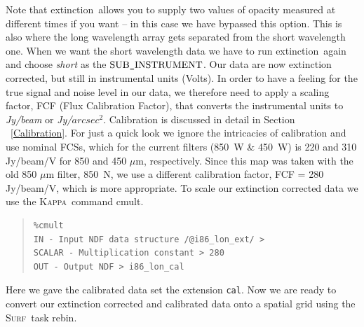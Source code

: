 \documentclass[twoside,11pt]{article}
\newenvironment{myquote}{\begin{quote}\begin{small}}{\end{small}\end{quote}}
\newcommand{\Kappa}{\xref{\textsc{Kappa}}{sun95}{}}
\newcommand{\surf}{\xref{\textsc{Surf}}{sun216}{}}
\newcommand{\task}[1]{\textsf{#1}}
\newcommand{\rebin}{\xref{\task{rebin}}{sun216}{REBIN}}
\newcommand{\ext}{\xref{\task{extinction}}{sun216}{EXTINCTION}}
\newcommand{\cmult}{\xref{\task{cmult}}{sun95}{CMULT}}
\newcommand{\xref}[3]{#1}
\renewcommand{\_}{\texttt{\symbol{95}}}
\begin{document}
Note that \ext\ allows you to supply two values of opacity measured at
different times if you want -- in this case we have bypassed this
option.  This is also where the long wavelength array gets separated
from the short wavelength one.  When we want the short wavelength data
we have to run \ext\ again and choose {\it short} as the $\rm
SUB\_INSTRUMENT$.  Our data are now extinction corrected, but still in
instrumental units (Volts).  In order to have a feeling for the true
signal and noise level in our data, we therefore need to apply a
scaling factor, FCF (Flux Calibration Factor), that converts the
instrumental units to {\it Jy/beam} or {\it Jy/$arcsec^2$}. 
Calibration is discussed in detail in Section \ \ref{Calibration}. 
For just a quick look we ignore the intricacies of calibration and use
nominal FCSs, which for the current filters (850~W \& 450~W) is 220
and 310 Jy/beam/V for 850 and 450 $\mu$m, respectively.  Since this
map was taken with the old 850 $\mu$m filter, 850~N, we use a
different calibration factor, FCF = 280 Jy/beam/V, which is more
appropriate.  To scale our extinction corrected data we use the
\Kappa\ command \cmult.



\begin{myquote}
\begin{verbatim}
%cmult
IN - Input NDF data structure /@i86_lon_ext/ > 
SCALAR - Multiplication constant > 280
OUT - Output NDF > i86_lon_cal
\end{verbatim}
\end{myquote}

Here we gave the calibrated data set the extension \texttt{\_cal}. 
Now we are ready to convert our extinction corrected and calibrated 
data onto a spatial grid using the \surf\ task \rebin.
\end{document}
